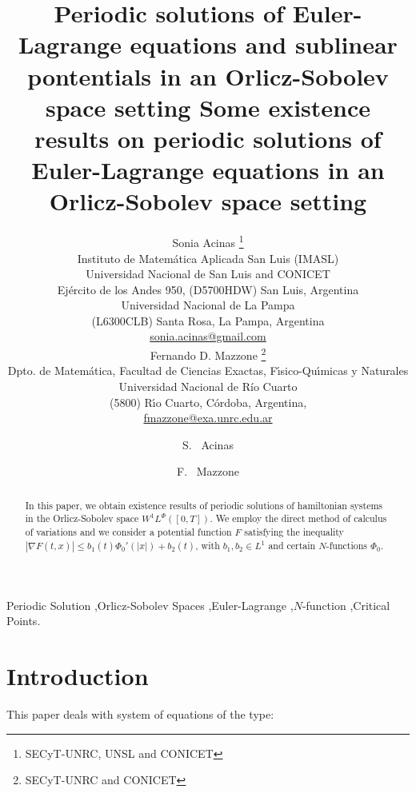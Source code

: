 \documentclass[twoside]{elsarticle}
\title{Periodic solutions of
Euler-Lagrange equations and sublinear pontentials   in an Orlicz-Sobolev space setting }
\author{Sonia Acinas \thanks{SECyT-UNRC, UNSL and CONICET}\\
Instituto de Matem\'atica Aplicada San Luis (IMASL)\\
Universidad Nacional de San Luis and CONICET\\
Ej\'ercito de los Andes 950,
(D5700HDW) San Luis, Argentina\\
Universidad Nacional de La Pampa\\
(L6300CLB) Santa Rosa, La Pampa, Argentina\\
\url{sonia.acinas@gmail.com}\\[3mm]
Fernando D. Mazzone \thanks{SECyT-UNRC and CONICET}\\
Dpto. de Matem\'atica, Facultad de Ciencias Exactas, F\'{\i}sico-Qu\'{\i}micas y Naturales\\
Universidad Nacional de R\'{i}o Cuarto\\
(5800) R\'{\i}o Cuarto, C\'ordoba, Argentina,\\
\url{fmazzone@exa.unrc.edu.ar}
}
\date{}
\theoremstyle{remark}
\newcommand{\lphi}{L^{\Phi}}
\newcommand{\wphi}{W^{1}\lphi}
\renewcommand{\leq}{\leqslant}
\begin{document}
\begin{frontmatter}
\title{Some existence results on periodic solutions of
Euler-Lagrange equations in an Orlicz-Sobolev space setting}



\author[imasl,unlpam]{S. ~Acinas }
\author[unrc,unlpam]{F. ~Mazzone }


\address[imasl]{Instituto de Matem\'atica Aplicada San Luis (CONICET-UNSL),\\
(5700) San Luis, Argentina.  }

\address[unlpam]{Universidad Nacional de La Pampa,
(6300) Santa Rosa, La Pampa, Argentina.  }

\address[unrc]{Dpto. de Matem\'atica, Facultad de Ciencias Exactas, F\'{\i}sico-Qu\'{\i}micas y Naturales,
Universidad Nacional de R\'{i}o Cuarto,
(5800) R\'{\i}o Cuarto, C\'ordoba, Argentina. }




\begin{abstract}




In this paper, we obtain existence results of periodic solutions of hamiltonian systems in the Orlicz-Sobolev space $\wphi([0,T])$.
We employ the direct method of calculus of variations and we consider  a potential  function $F$ satisfying the inequality
$|\nabla F(t,x)|\leq b_1(t) \Phi_0'(|x|)+b_2(t)$, with  $b_1, b_2\in L^1$ and  certain $N$-functions $\Phi_0$.
\end{abstract}
\begin{keyword}
Periodic Solution \sep Orlicz-Sobolev Spaces \sep  Euler-Lagrange  \sep $N$-function   \sep Critical Points.
\end{keyword}

\end{frontmatter}







\section{Introduction}
This paper deals with system  of equations of the type:
\end{document}
